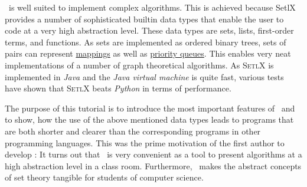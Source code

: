 \setlx\ is well suited to implement complex algorithms. This is achieved because SetlX
provides a number of sophisticated builtin data types that enable the user to code at a very high
abstraction level.
These data types are sets, lists, first-order terms, and functions.  
As sets are implemented as ordered binary trees, sets of pairs can represent
\href{https://en.wikipedia.org/wiki/Map_(mathematics)}{mappings} as well as
\href{https://en.wikipedia.org/wiki/Priority_queue}{priority queues}.  This enables very neat implementations
of a number of graph theoretical algorithms.  As \textsc{SetlX} is implemented in \textsl{Java} and
the \emph{Java virtual machine} is quite fast, various tests have shown that \textsc{SetlX} beats
\textsl{Python} in terms of performance. 


The purpose of this tutorial is to introduce the most important features of \setlx\ and to
show, how the use of the above mentioned data types leads to programs that are both shorter
and clearer than the corresponding programs in other programming languages.  This was the
prime motivation of the first author to develop \setlx:  It turns out that \setlx\ is very
convenient as a tool to present algorithms at a high abstraction level in a class room. 
Furthermore, \setlx\ makes the abstract concepts of set theory tangible for students of
computer science.  

